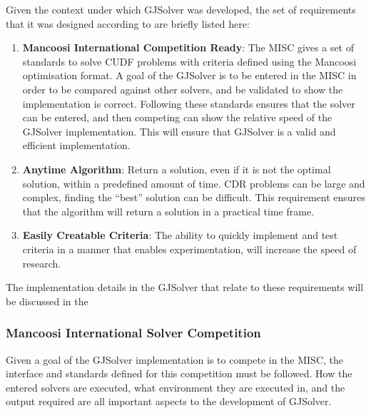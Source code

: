 Given the context under which GJSolver was developed, the set of requirements that it was designed according to are briefly listed here:
\begin{enumerate}
  \item \textbf{Mancoosi International Competition Ready}: The MISC gives a set of standards to solve CUDF problems with criteria defined using the Mancoosi optimisation format.
  A goal of the GJSolver is to be entered in the MISC in order to be compared against other solvers, and be validated to show the implementation is correct.
  Following these standards ensures that the solver can be entered, and then competing can show the relative speed of the GJSolver implementation.
  This will ensure that GJSolver is a valid and efficient implementation. 
  \item \textbf{Anytime Algorithm}: Return a solution, even if it is not the optimal solution, within a predefined amount of time. 
  CDR problems can be large and complex, finding the ``best'' solution can be difficult. 
  This requirement ensures that the algorithm will return a solution in a practical time frame.
  \item \textbf{Easily Creatable Criteria}: The ability to quickly implement and test criteria in a manner that enables experimentation, will increase the speed of research.
\end{enumerate}

The implementation details in the GJSolver that relate to these requirements will be discussed in the 

\subsubsection{Mancoosi International Solver Competition}
Given a goal of the GJSolver implementation is to compete in the MISC, the interface and standards defined for this competition must be followed.
How the entered solvers are executed, what environment they are executed in, and the output required are all important aspects to the development of GJSolver.

